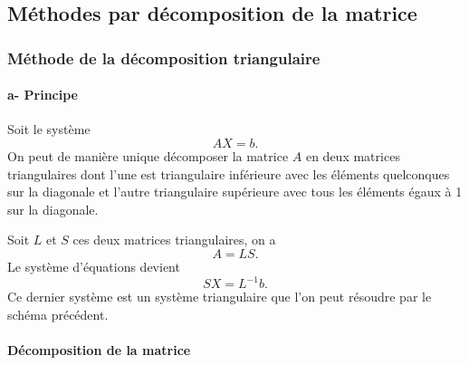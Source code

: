 \subsection{Méthodes par décomposition de la matrice}

\subsubsection{Méthode de la décomposition triangulaire}

\paragraph{a- Principe}

Soit le système
\[
  AX = b .
\]
On peut de manière unique décomposer la matrice $A$ en deux matrices
triangulaires dont l'une est triangulaire inférieure avec les éléments
quelconques sur la diagonale et l'autre triangulaire supérieure avec tous les
éléments égaux à 1 sur la diagonale.

Soit $L$ et $S$ ces deux matrices triangulaires, on a
\[
  A = LS .
\]
Le système d'équations devient
\[
  SX = L^{-1}b .
\]
Ce dernier système est un système triangulaire que l'on peut résoudre par le
schéma précédent.

\paragraph{Décomposition de la matrice}

